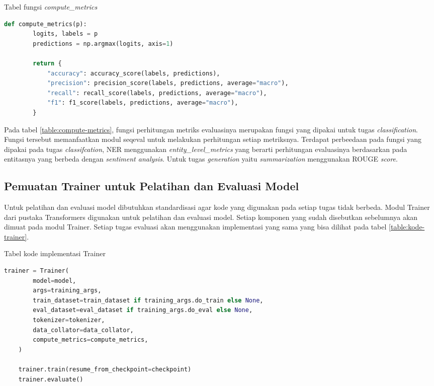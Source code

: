 \begin{table}
    \caption{Tabel fungsi \textit{compute\_metrics}}
    \label{table:compute-metrics}
    \begin{lstlisting}[language=python]
    def compute_metrics(p):
        logits, labels = p
        predictions = np.argmax(logits, axis=1)

        return {
            "accuracy": accuracy_score(labels, predictions),
            "precision": precision_score(labels, predictions, average="macro"),
            "recall": recall_score(labels, predictions, average="macro"),
            "f1": f1_score(labels, predictions, average="macro"),
        }
    \end{lstlisting}
\end{table}

Pada tabel \ref{table:compute-metrics}, fungsi perhitungan metriks evaluasinya merupakan fungsi yang dipakai untuk tugas \textit{classification}. Fungsi tersebut memanfaatkan modul seqeval untuk melakukan perhitungan setiap metriksnya. Terdapat perbeedaan pada fungsi yang dipakai pada tugas \textit{classifcation}, NER menggunakan \textit{entity\_level\_metrics} yang berarti perhitungan evaluasinya berdasarkan pada entitasnya yang berbeda dengan \textit{sentiment analysis}. Untuk tugas \textit{generation} yaitu \textit{summarization} menggunakan ROUGE \textit{score}.

\subsection{Pemuatan Trainer untuk Pelatihan dan Evaluasi Model}

Untuk pelatihan dan evaluasi model dibutuhkan standardisasi agar kode yang digunakan pada setiap tugas tidak berbeda. Modul Trainer dari pustaka Transformers digunakan untuk pelatihan dan evaluasi model. Setiap komponen yang sudah disebutkan sebelumnya akan dimuat pada modul Trainer. Setiap tugas evaluasi akan menggunakan implementasi yang sama yang bisa dilihat pada tabel \ref{table:kode-trainer}.

\begin{table}
    \caption{Tabel kode implementasi Trainer}
    \label{table:kode-trainer}
    \begin{lstlisting}[language=python]
    trainer = Trainer(
        model=model,
        args=training_args,
        train_dataset=train_dataset if training_args.do_train else None,
        eval_dataset=eval_dataset if training_args.do_eval else None,
        tokenizer=tokenizer,
        data_collator=data_collator,
        compute_metrics=compute_metrics,
    )

    trainer.train(resume_from_checkpoint=checkpoint)
    trainer.evaluate()
    \end{lstlisting}
\end{table}

